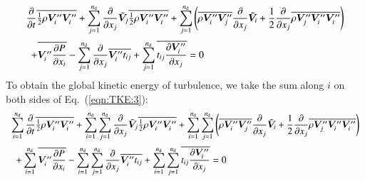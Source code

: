 \documentclass{warpdoc}
\newcommand{\alb}{\vspace{0.2cm}\\} %
\newcommand{\nd}{{{n}_{\rm d}}}
\newcommand{\mfc}{\textstyle}
\newcommand{\mfd}{\displaystyle}
\begin{document}
\begin{equation}
  \begin{array}{l}
  \mfd \frac{\partial }{\partial t} \overline{{\mfc\frac{1}{2}}\rho \bm{V}_i^{\prime\prime} \bm{V}_i^{\prime\prime} }
                          +  \sum_{j=1}^{\nd}\frac{\partial }{\partial x_j} {\wtilde{\bm{V}}_j} \overline{{\mfc \frac{1}{2}} \rho \bm{V}_i^{\prime\prime} \bm{V}_i^{\prime\prime}}
   + \mfd\sum_{j=1}^{\nd} \left(
                              \overline{\rho \bm{V}_i^{\prime\prime} \bm{V}_j^{\prime\prime}}
                                     \frac{\partial }{\partial x_j} {\wtilde{\bm{V}}_i}
                          +  {\frac{1}{2}}\frac{\partial }{\partial x_j} \overline{\rho {\bm{V}_j^{\prime\prime}} \bm{V}_i^{\prime\prime} \bm{V}_i^{\prime\prime}}
                     \right) \alb~~
   + \mfd\overline{\bm{V}_i^{\prime\prime} \frac{\partial P}{\partial x_i}}
   - \mfd\sum_{j=1}^{\nd} \frac{\partial }{\partial x_j} \overline{\bm{V}_i^{\prime\prime} t_{ij}}
     +\sum_{j=1}^{\nd} \overline{ t_{ij}\frac{\partial \bm{V}_i^{\prime\prime}}{\partial x_j}}
   = 0
  \end{array}
  \label{eqn:TKE:3}
\end{equation}
%
To obtain the global kinetic energy of turbulence, we take the sum along
$i$ on both sides of Eq.\ (\ref{eqn:TKE:3}):
%
\begin{equation}
  \begin{array}{l}
  \mfd \sum_{i=1}^\nd \frac{\partial }{\partial t} \overline{{\mfc\frac{1}{2}}\rho \bm{V}_i^{\prime\prime} \bm{V}_i^{\prime\prime} }
                          +  \sum_{i=1}^\nd\sum_{j=1}^{\nd}\frac{\partial }{\partial x_j} {\wtilde{\bm{V}}_j} \overline{{\mfc \frac{1}{2}} \rho \bm{V}_i^{\prime\prime} \bm{V}_i^{\prime\prime}}
   + \sum_{i=1}^\nd \mfd\sum_{j=1}^{\nd} \left(
                              \overline{\rho \bm{V}_i^{\prime\prime} \bm{V}_j^{\prime\prime}}
                                     \frac{\partial }{\partial x_j} {\wtilde{\bm{V}}_i}
                          +  {\frac{1}{2}}\frac{\partial }{\partial x_j} \overline{\rho {\bm{V}_j^{\prime\prime}} \bm{V}_i^{\prime\prime} \bm{V}_i^{\prime\prime}}
                     \right) \alb~~
   + \mfd\sum_{i=1}^{\nd}\overline{\bm{V}_i^{\prime\prime} \frac{\partial P}{\partial x_i}}
   - \mfd\sum_{i=1}^\nd\sum_{j=1}^{\nd} \frac{\partial }{\partial x_j} \overline{\bm{V}_i^{\prime\prime} t_{ij}}
     +\sum_{i=1}^\nd\sum_{j=1}^{\nd} \overline{ t_{ij}\frac{\partial \bm{V}_i^{\prime\prime}}{\partial x_j}}
   = 0
  \end{array}
  \label{eqn:TKE:4}
\end{equation}
\end{document}
